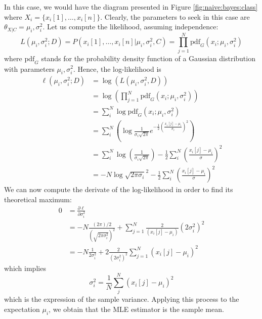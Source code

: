 In this case, we would have the diagram presented in Figure \ref{fig:naive:bayes:class}
where \(X_{i} = \{x_{i}[1],\dots,x_{i}[n]\}\). Clearly, the parameters to seek in this case are \(\theta_{X|C} = \mu_{i},\sigma_{i}^{2}\). Let us compute the likelihood, assuming independence:
\[
    L(\mu_{i},\sigma_{i}^{2}; D) = P(x_{i}[1],\dots,x_{i}[n]|\mu_{i},\sigma_{i}^{2},C) = \prod_{j=1}^{N} \text{pdf}_{G}(x_{i}; \mu_{i}, \sigma_{i}^{2})
\]
where \(\text{pdf}_{G}\) stands for the probability density function of a Gaussian distribution with parameters \(\mu_{i},\sigma_{i}^{2}\). Hence, the log-likelihood is
\begin{align*}
    \ell(\mu_{i},\sigma_{i}^{2}; D) & = \log \left( L(\mu_{i},\sigma_{i}^{2}, D)\right)                                                                                 \\
                                    & = \log \left(  \prod_{j=1}^{N} \text{pdf}_{G}(x_{i}; \mu_{i}, \sigma_{i}^{2}) \right)                                             \\
                                    & = \sum_{i}^{N} \log \text{pdf}_{G}(x_{i}; \mu_{i},\sigma_{i}^{2})                                                                 \\
                                    & = \sum_{i}^N \left( \log\frac{1}{\sigma_i \sqrt{2\pi}} e^{-\frac{1}{2}\left(\frac{x_i[j] - \mu_i}{\sigma_i}\right)^2}\right)      \\
                                    & = \sum_{i}^N \log \left(\frac{1}{\sigma_i \sqrt{2\pi}}\right) - \frac{1}{2}\sum_i^N  \left(\frac{x_i[j] - \mu_i}{\sigma}\right)^2 \\
                                    & = - N \log \sqrt{2\pi \sigma_i}^2 - \frac{1}{2}\sum_i^N  \left(\frac{x_i[j] - \mu_i}{\sigma}\right)^2
\end{align*}
We can now compute the derivate of the log-likelihood in order to find its theoretical maximum:
\begin{align*}
    0 & = \frac{\partial \ell}{\partial \sigma_{i}^{2}}                                                                                              \\
      & = - N \frac{(2 \pi)/2 }{\left(\sqrt{2\pi \sigma_{i}^{2}}\right)^{2}}  + \sum_{j=1}^{N} \frac{2}{(x_{i}[j] - \mu_{i})}{(2\sigma_{i}^{2})^{2}} \\
      & = -N \frac{1}{2 \sigma_{i}^{2}} + 2 \frac{2}{(2\sigma_{i}^{2})^{2}} \sum_{j=1}^{N}(x_{i}[j] - \mu_{i})^{2}
\end{align*}
which implies
\[
    \sigma_{i}^{2} = \frac{1}{N} \sum_{j}^{N}(x_{i}[j] - \mu_{i})^{2}
\]
which is the expression of the sample variance. Applying this process to the expectation \(\mu_i\), we obtain that the MLE estimator is the sample mean.

